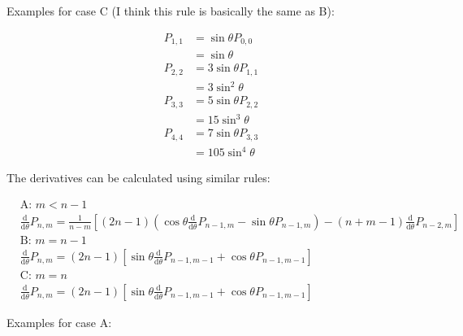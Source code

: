 \documentclass[]{article}
\begin{document}
		Examples for case C (I think this rule is basically the same as B):
		
		\begin{align}
			P_{1,1} &= \sin{\theta}P_{0,0} \\
					&= \sin{\theta} \\
			P_{2,2} &= 3\sin{\theta}P_{1,1} \\
					&= 3\sin^2{\theta} \\
			P_{3,3} &= 5\sin{\theta}P_{2,2} \\
					&= 15\sin^3{\theta} \\
			P_{4,4} &= 7\sin{\theta}P_{3,3} \\
					&= 105\sin^4{\theta}
		\end{align}
		
		The derivatives can be calculated using similar rules:
		
		\begin{align}
			&\text{A: }  m < n-1  \nonumber \\ 
			&\frac{\text{d}}{\text{d}\theta} P_{n,m} = \frac{1}{n-m} \left[(2n-1)\left(\cos{\theta}\frac{\text{d}}{\text{d}\theta}P_{n-1,m} - \sin{\theta}P_{n-1,m}\right) - (n+m-1)\frac{\text{d}}{\text{d}\theta}P_{n-2,m}\right] \\
			&\text{B: }  m = n-1  \nonumber \\ 
			&\frac{\text{d}}{\text{d}\theta} P_{n,m} = (2n-1) \left[\sin{\theta}\frac{\text{d}}{\text{d}\theta}P_{n-1,m-1} + \cos{\theta}P_{n-1,m-1}\right] \\
			&\text{C: }  m = n  \nonumber \\ 
			&\frac{\text{d}}{\text{d}\theta} P_{n,m} = (2n-1) \left[\sin{\theta}\frac{\text{d}}{\text{d}\theta}P_{n-1,m-1} + \cos{\theta}P_{n-1,m-1}\right]
		\end{align}
		
		Examples for case A:
		
\end{document}
